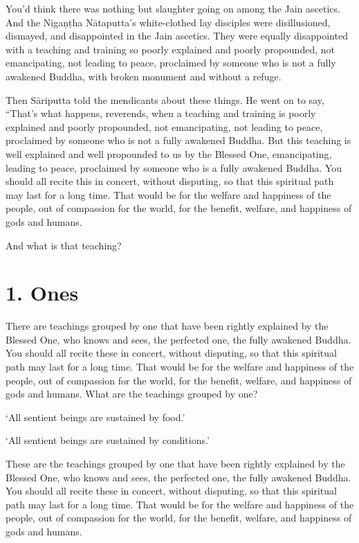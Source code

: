 \documentclass[12pt,openany]{book}%
\begin{document}
You’d think there was nothing but slaughter going on among the Jain ascetics. And the \textsanskrit{Nigaṇṭha} \textsanskrit{Nātaputta}’s white-clothed lay disciples were disillusioned, dismayed, and disappointed in the Jain ascetics. They were equally disappointed with a teaching and training so poorly explained and poorly propounded, not emancipating, not leading to peace, proclaimed by someone who is not a fully awakened Buddha, with broken monument and without a refuge. 

Then \textsanskrit{Sāriputta} told the mendicants about these things. He went on to say, “That’s what happens, reverends, when a teaching and training is poorly explained and poorly propounded, not emancipating, not leading to peace, proclaimed by someone who is not a fully awakened Buddha. But this teaching is well explained and well propounded to us by the Blessed One, emancipating, leading to peace, proclaimed by someone who is a fully awakened Buddha. You should all recite this in concert, without disputing, so that this spiritual path may last for a long time. That would be for the welfare and happiness of the people, out of compassion for the world, for the benefit, welfare, and happiness of gods and humans. 

And what is that teaching? 

\section*{1. Ones }

There are teachings grouped by one that have been rightly explained by the Blessed One, who knows and sees, the perfected one, the fully awakened Buddha. You should all recite these in concert, without disputing, so that this spiritual path may last for a long time. That would be for the welfare and happiness of the people, out of compassion for the world, for the benefit, welfare, and happiness of gods and humans. What are the teachings grouped by one? 

‘All sentient beings are sustained by food.’ 

‘All sentient beings are sustained by conditions.’ 

These are the teachings grouped by one that have been rightly explained by the Blessed One, who knows and sees, the perfected one, the fully awakened Buddha. You should all recite these in concert, without disputing, so that this spiritual path may last for a long time. That would be for the welfare and happiness of the people, out of compassion for the world, for the benefit, welfare, and happiness of gods and humans. 
\end{document}
